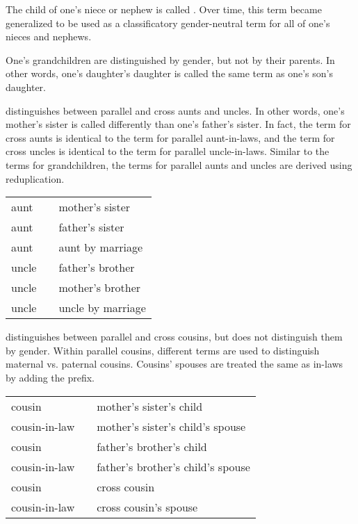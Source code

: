 The child of one's niece or nephew is called  . Over time, this term became generalized to be used as a classificatory gender-neutral term for all of one's nieces and nephews.

One's grandchildren are distinguished by gender, but not by their parents. In other words, one's daughter's daughter is called the same term as one's son's daughter.

\begin{description}[leftmargin=!,labelwidth=\widthof{\bfseries granddaughter}]
	\item[granddaughter]   
	\item[grandson]   
	\item[grandchild]   
\end{description}

\langtvk{} distinguishes between parallel and cross aunts and uncles. In other words, one's mother's sister is called differently than one's father's sister. In fact, the term for cross aunts is identical to the term for parallel aunt-in-laws, and the term for cross uncles is identical to the term for parallel uncle-in-laws. Similar to the terms for grandchildren, the terms for parallel aunts and uncles are derived using reduplication.

\exdisplay\noexno
\begin{tabu} {l l l}
	aunt &  & mother's sister\\
	aunt &  & father's sister\\
	aunt &  & aunt by marriage\\
	uncle &  & father's brother\\
	uncle &  & mother's brother\\
	uncle &  & uncle by marriage\\
\end{tabu}
\xe

\langtvk{} distinguishes between parallel and cross cousins, but does not distinguish them by gender. Within parallel cousins, different terms are used to distinguish maternal vs. paternal cousins. Cousins' spouses are treated the same as in-laws by adding the  prefix.

\exdisplay\noexno
\begin{tabu} {l l l}
	cousin &  & mother's sister's child\\
	cousin-in-law &  & mother's sister's child's spouse\\
	cousin &  & father's brother's child\\
	cousin-in-law &  & father's brother's child's spouse\\
	cousin &  & cross cousin\\
	cousin-in-law &  & cross cousin's spouse\\
\end{tabu}
\xe

